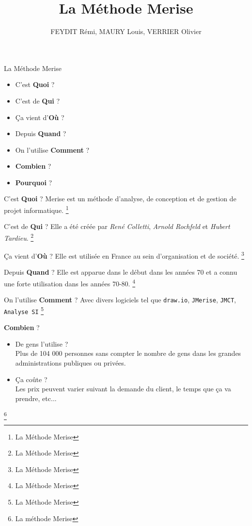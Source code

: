 \documentclass{beamer}
\begin{document}
\begin{frame} %
\title{La Méthode Merise}
\author{FEYDIT Rémi, MAURY Louis, VERRIER Olivier}
\titlepage
\end{frame}

\begin{frame}{La Méthode Merise} %
\begin{itemize}
\item C'est \textbf{Quoi} ?
\item C'est de \textbf{Qui} ?
\item Ça vient d'\textbf{Où} ?
\item Depuis \textbf{Quand} ?
\item On l'utilise \textbf{Comment} ?
\item \textbf{Combien} ?
\item \textbf{Pourquoi} ?
\end{itemize}
\end{frame}

\begin{frame}{C'est \textbf{Quoi} ?}
Merise est un méthode d’analyse, de conception et de gestion de projet informatique.
\footnote{La Méthode Merise}
\end{frame}

\begin{frame}{C'est de \textbf{Qui} ?}
Elle a été créée par \textsl{René Colletti}, \textsl{Arnold Rochfeld} et \textsl{Hubert Tardieu}.
\footnote{La Méthode Merise}
\end{frame}

\begin{frame}{Ça vient d'\textbf{Où} ?}
Elle est utilisée en France au sein d’organisation et de société.
\footnote{La Méthode Merise}
\end{frame}

\begin{frame}{Depuis \textbf{Quand} ?}
Elle est apparue dans le début dans les années 70 et a connu une forte utilisation dans les années 70-80.
\footnote{La Méthode Merise}
\end{frame}

\begin{frame}{On l'utilise \textbf{Comment} ?}
Avec divers logiciels tel que \texttt{draw.io}, \texttt{JMerise}, \texttt{JMCT}, \texttt{Analyse SI}
\footnote{La Méthode Merise}
\end{frame}

\begin{frame}{\textbf{Combien} ?}
\begin{itemize}
\item De gens l'utilise ?\\
Plus de 104 000 personnes sans compter le nombre de gens dans les grandes administrations publiques ou privées.
\item Ça coûte ?\\
Les prix peuvent varier suivant la demande du client, le temps que ça va prendre, etc...
\end{itemize}
\footnote{La méthode Merise}
\end{frame}
\end{document}
